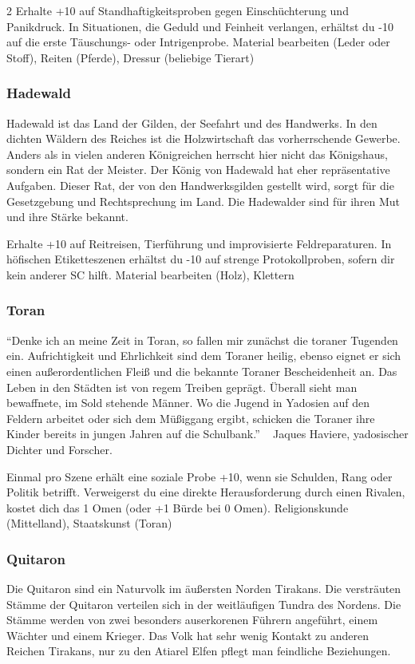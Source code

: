 {\begin{multicols*}{2}
        \abstammungspielwertebox
        {Erhalte +10 auf Standhaftigkeitsproben gegen Einschüchterung und Panikdruck.}
        {In Situationen, die Geduld und Feinheit verlangen, erhältst du -10 auf die erste Täuschungs- oder Intrigenprobe.}
        {Material bearbeiten (Leder oder Stoff), Reiten (Pferde), Dressur (beliebige Tierart)}

        \subsubsection*{Hadewald}
        Hadewald ist das Land der Gilden, der Seefahrt und des Handwerks. In den dichten Wäldern des Reiches ist die Holzwirtschaft das vorherrschende Gewerbe. Anders als in vielen anderen Königreichen herrscht hier nicht das Königshaus, sondern ein Rat der Meister. Der König von Hadewald hat eher repräsentative Aufgaben. Dieser Rat, der von den Handwerksgilden gestellt wird, sorgt für die Gesetzgebung und Rechtsprechung im Land. Die Hadewalder sind für ihren Mut und ihre Stärke bekannt.

        \abstammungspielwertebox
        {Erhalte +10 auf Reitreisen, Tierführung und improvisierte Feldreparaturen.}
        {In höfischen Etiketteszenen erhältst du -10 auf strenge Protokollproben, sofern dir kein anderer SC hilft.}
        {Material bearbeiten (Holz), Klettern}

        \subsubsection*{Toran}
        ``Denke ich an meine Zeit in Toran, so fallen mir zunächst die toraner Tugenden ein. Aufrichtigkeit und Ehrlichkeit sind dem Toraner heilig, ebenso eignet er sich einen außerordentlichen Fleiß und die bekannte Toraner Bescheidenheit an. Das Leben in den Städten ist von regem Treiben geprägt. Überall sieht man bewaffnete, im Sold stehende Männer. Wo die Jugend in Yadosien auf den Feldern arbeitet oder sich dem Müßiggang ergibt, schicken die Toraner ihre Kinder bereits in jungen Jahren auf die Schulbank.'' ~ Jaques Haviere, yadosischer Dichter und Forscher.

        \abstammungspielwertebox
        {Einmal pro Szene erhält eine soziale Probe +10, wenn sie Schulden, Rang oder Politik betrifft.}
        {Verweigerst du eine direkte Herausforderung durch einen Rivalen, kostet dich das 1 Omen (oder +1 Bürde bei 0 Omen).}
        {Religionskunde (Mittelland), Staatskunst (Toran)}

        \subsubsection*{Quitaron}
        Die Quitaron sind ein Naturvolk im äußersten Norden Tirakans. Die versträuten Stämme der Quitaron verteilen sich in der weitläufigen Tundra des Nordens. Die Stämme werden von zwei besonders auserkorenen Führern angeführt, einem Wächter und einem Krieger. Das Volk hat sehr wenig Kontakt zu anderen Reichen Tirakans, nur zu den Atiarel Elfen pflegt man feindliche Beziehungen.


\end{multicols*}}
